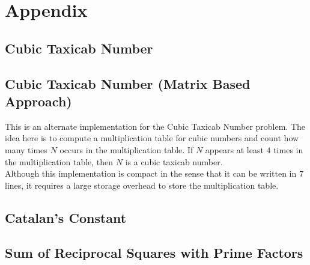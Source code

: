 \section{Appendix}

\subsection{Cubic Taxicab Number}




\newpage
\subsection{Cubic Taxicab Number (Matrix Based Approach)}
This is an alternate implementation for the Cubic Taxicab Number problem. The idea here is to compute a multiplication table for cubic numbers and count how many times $N$ occurs in the multiplication table. If $N$ appears at least $4$ times in the multiplication table, then $N$ is a cubic taxicab number.\\

\noindent
Although this implementation is compact in the sense that it can be written in $7$ lines, it requires a large storage overhead to store the multiplication table.



\subsection{Catalan's Constant}


\newpage
\subsection{Sum of Reciprocal Squares with Prime Factors}

